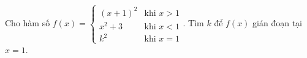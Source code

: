 \begin{ex}
Cho hàm số $f(x)=\begin{cases}(x+1)^2&\text{khi }x>1\\x^2+3&\text{khi }x<1\\k^2&\text{khi }x=1\end{cases}$. Tìm $k$ để $f(x)$ gián đoạn tại $x=1$.
\end{ex}
